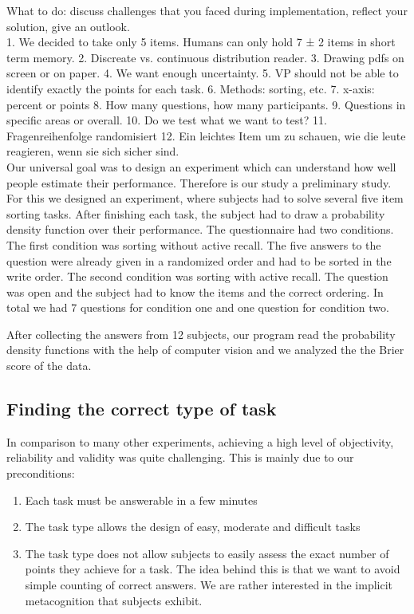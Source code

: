\documentclass[../main/main.tex]{subfiles}
\begin{document}
	What to do: discuss challenges that you faced during implementation, reflect your solution, give an outlook.\\
	
	1. We decided to take only 5 items. Humans can only hold 7 ± 2 items in short term memory.
	2. Discreate vs. continuous distribution reader.
	3. Drawing pdfs on screen or on paper.
	4. We want enough uncertainty.
	5. VP should not be able to identify exactly the points for each task.
	6. Methods: sorting, etc.
	7. x-axis: percent or points
	8. How many questions, how many participants.
	9. Questions in specific areas or overall.
	10. Do we test what we want to test?
	11. Fragenreihenfolge randomisiert
	12. Ein leichtes Item um zu schauen, wie die leute reagieren, wenn sie sich sicher sind.
	\\
	
	\noindent Our universal goal was to design an experiment which can understand how well people estimate their performance. Therefore is our study a preliminary study. For this we designed an experiment, where subjects had to solve several five item sorting tasks. After finishing each task, the subject had to draw a probability density function over their performance. The questionnaire had two conditions. The first condition was sorting without active recall. The five answers to the question were already given in a randomized order and had to be sorted in the write order. The second condition was sorting with active recall. The question was open and the subject had to know the items and the correct ordering. In total we had 7 questions for condition one and one question for condition two.
	
	After collecting the answers from 12 subjects, our program read the probability density functions with the help of computer vision and we analyzed the the Brier score of the data.
	
	\subsection{Finding the correct type of task}
	
	In comparison to many other experiments, achieving a high level of objectivity, reliability and validity was quite challenging. This is mainly due to our preconditions:
	
	\begin{enumerate}
		\item Each task must be answerable in a few minutes
		\item The task type allows the design of easy, moderate and difficult tasks
		\item The task type does not allow subjects to easily assess the exact number of points they achieve for a task. The idea behind this is that we want to avoid simple counting of correct answers. We are rather interested in the implicit metacognition that subjects exhibit. 
	\end{enumerate}
\end{document}
